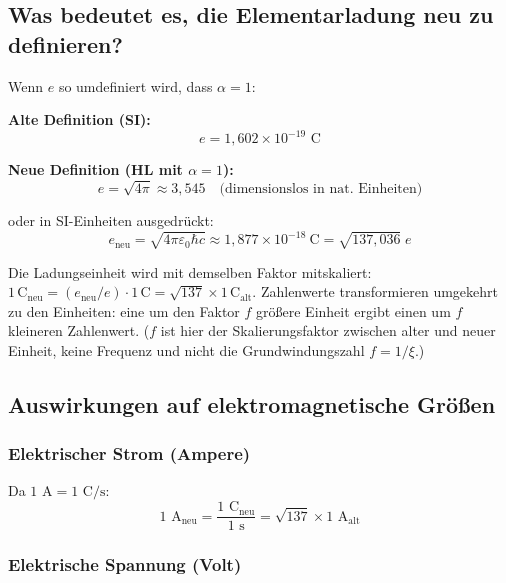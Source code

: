 	\subsection{Was bedeutet es, die Elementarladung neu zu definieren?}
	
	Wenn $e$ so umdefiniert wird, dass $\alpha = 1$:
	
	\textbf{Alte Definition (SI):}
	\begin{equation}
		e = 1{,}602 \times 10^{-19} \text{ C}
	\end{equation}
	
	\textbf{Neue Definition (HL mit $\alpha = 1$):}
	\begin{equation}
		e = \sqrt{4\pi} \approx 3{,}545 \quad \text{(dimensionslos in nat. Einheiten)}
	\end{equation}
	
	oder in SI-Einheiten ausgedrückt:
	\begin{equation}
		e_{\text{neu}} = \sqrt{4\pi\varepsilon_0\hbar c} \approx 1{,}877 \times 10^{-18}\ \text{C} = \sqrt{137{,}036}\; e
	\end{equation}
	
	Die Ladungseinheit wird mit demselben Faktor mitskaliert: $1\,\text{C}_{\text{neu}} = (e_{\text{neu}}/e)\cdot 1\,\text{C} = \sqrt{137}\times 1\,\text{C}_{\text{alt}}$. Zahlenwerte transformieren umgekehrt zu den Einheiten: eine um den Faktor $f$ größere Einheit ergibt einen um $f$ kleineren Zahlenwert. ($f$ ist hier der Skalierungsfaktor zwischen alter und neuer Einheit, keine Frequenz und nicht die Grundwindungszahl $f = 1/\xi$.)

	\subsection{Auswirkungen auf elektromagnetische Größen}
	
	\subsubsection{Elektrischer Strom (Ampere)}
	
	Da $1 \text{ A} = 1 \text{ C/s}$:
	\begin{equation}
		1 \text{ A}_{\text{neu}} = \frac{1 \text{ C}_{\text{neu}}}{1 \text{ s}} = \sqrt{137} \times 1 \text{ A}_{\text{alt}}
	\end{equation}
	
	\subsubsection{Elektrische Spannung (Volt)}
	
